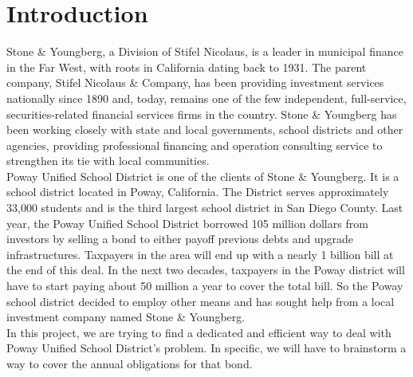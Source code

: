 \documentclass[oneside,12pt]{report}
\begin{document}
{%
\tableofcontents

\listoffigures

\listoftables


\renewcommand{\thefootnote}{\arabic{footnote}}
\setcounter{footnote}{0}

\chapter{Introduction}\label{}

Stone \& Youngberg, a Division of Stifel Nicolaus, is a leader in municipal finance in the Far West, with roots in California dating back to 1931. The parent company, Stifel Nicolaus \& Company, has been providing investment services nationally since 1890 and, today, remains one of the few independent, full-service, securities-related financial services firms in the country. Stone \& Youngberg has been working closely with state and local governments, school districts and other agencies, providing professional financing and operation consulting service to strengthen its tie with local communities.\\

\noindent Poway Unified School District is one of the clients of Stone \& Youngberg. It is a school district located in Poway, California. The District serves approximately 33,000 students and is the third largest school district in San Diego County. Last year, the Poway Unified School District borrowed 105 million dollars from investors by selling a bond to either payoff previous debts and upgrade infrastructures. Taxpayers in the area will end up with a nearly 1 billion bill at the end of this deal. In the next two decades, taxpayers in the Poway district will have to start paying about 50 million a year to cover the total bill. So the Poway school district decided to employ other means and has sought help from a local investment company named Stone \& Youngberg.\\

\noindent In this project, we are trying to find a dedicated and efficient way to deal with Poway Unified School District's problem. In specific, we will have to brainstorm a way to cover the annual obligations for that bond.



}
\end{document}
